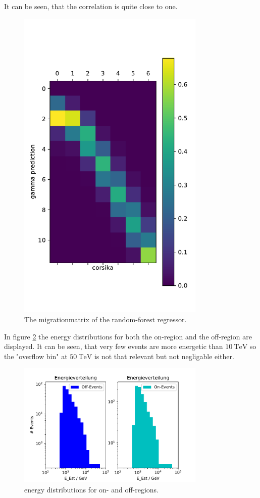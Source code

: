It can be seen, that the correlation is quite close to one.
\begin{figure}
  \centering
  \includegraphics[width=0.8\textwidth]{plots/Matrix.pdf}
  \caption{The migrationmatrix of the random-forest regressor.}
  \label{fig:matrix}
\end{figure}

In figure \ref{fig:Edist} the energy distributions for both the on-region and the off-region are displayed. It can be seen, that very few events are more energetic than $\SI{10}{\tera\electronvolt}$ so the "overflow bin" at $\SI{50}{\tera\electronvolt}$ is not that relevant but not negligable either.

\begin{figure}
  \centering
  \includegraphics[width=0.8\textwidth]{plots/E_verteilung.pdf}
  \caption{energy distributions for on- and off-regions.}
  \label{fig:Edist}
\end{figure}

